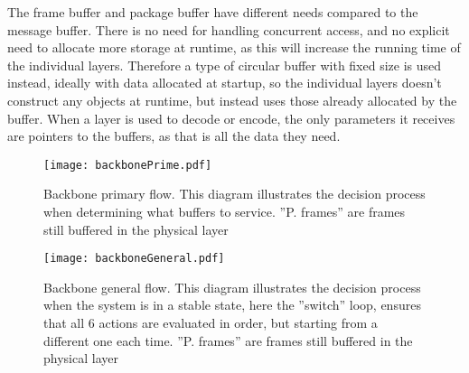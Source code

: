 The frame buffer and package buffer have different needs compared to the message buffer. There is no need for handling concurrent access, and no explicit need to allocate more storage at runtime, as this will increase the running time of the individual layers.
Therefore a type of circular buffer with fixed size is used instead, ideally with data allocated at startup, so the individual layers doesn't construct any objects at runtime, but instead uses those already allocated by the buffer.
When a layer is used to decode or encode, the only parameters it receives are pointers to the buffers, as that is all the data they need.

\begin{figure}[htb]
	\begin{center}
	\texttt{[image: backbonePrime.pdf]}
	\caption{Backbone primary flow. This diagram illustrates the decision process when determining what buffers to service. ''P. frames'' are frames still buffered in the physical layer}
	\label{fig:backboneprime}	
	\end{center}
\end{figure}

\begin{figure}[htb]
	\begin{center}
	\texttt{[image: backboneGeneral.pdf]}
	\caption{Backbone general flow. This diagram illustrates the decision process when the system is in a stable state, here the ''switch'' loop, ensures that all 6 actions are evaluated in order, but starting from a different one each time. ''P. frames'' are frames still buffered in the physical layer}
	\label{fig:backbonegeneral}	
	\end{center}
\end{figure}
